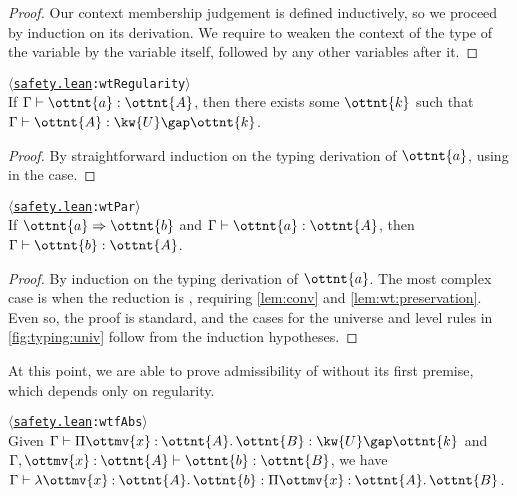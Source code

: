\documentclass[a4paper,UKenglish,cleveref,autoref,thm-restate]{lipics-v2021}
\newcommand{\repo}{https://github.com/ionathanch/TTBFL}
\newcommand{\thmref}[2]{%
  $\langle$\href{\repo/tree/main/src/#1}{\texttt{#1}}\texttt{:#2}$\rangle$%
}
\begin{document}
\begin{proof}
  Our context membership judgement is defined inductively,
  so we proceed by induction on its derivation.
  We require  to weaken the context of the type of the variable
  by the variable itself, followed by any other variables after it.
\end{proof}

\begin{lemma}[Regularity] \thmref{safety.lean}{wtRegularity} \label{lem:wt:reg} \\
  If $ \Gamma  \vdash  \ottnt{a}  \mathrel{:}  \ottnt{A} $, then there exists some $\ottnt{k}$ such that
  $ \Gamma  \vdash  \ottnt{A}  \mathrel{:}   \kw{U} \gap  \ottnt{k}  $.
\end{lemma}

\begin{proof}
  By straightforward induction on the typing derivation of $\ottnt{a}$,
  using  in the  case.
\end{proof}
\fi

\begin{theorem} \thmref{safety.lean}{wtPar} \label{lem:preservation} \\
  If $ \ottnt{a}  \Rightarrow  \ottnt{b} $ and $ \Gamma  \vdash  \ottnt{a}  \mathrel{:}  \ottnt{A} $, then $ \Gamma  \vdash  \ottnt{b}  \mathrel{:}  \ottnt{A} $.
\end{theorem}

\begin{proof}
  By induction on the typing derivation of $\ottnt{a}$.
  The most complex case is when the reduction is ,
  requiring \cref{lem:conv} and \cref{lem:wt:preservation}.
  Even so, the proof is standard,
  and the cases for the universe and level rules in \cref{fig:typing:univ}
  follow from the induction hypotheses.
\end{proof}

At this point, we are able to prove admissibility of 
without its first premise, which depends only on regularity.

\begin{corollary} \thmref{safety.lean}{wtfAbs} \label{Lam'} \\
  Given $ \Gamma  \vdash   \Pi  \ottmv{x}  \mathbin{:}  \ottnt{A}  \mathpunct{.}  \ottnt{B}   \mathrel{:}   \kw{U} \gap  \ottnt{k}  $ and $  \Gamma ,  \ottmv{x}  \mathbin{:}  \ottnt{A}   \vdash  \ottnt{b}  \mathrel{:}  \ottnt{B} $,
  we have $ \Gamma  \vdash   \lambda  \ottmv{x}  \mathbin{:}  \ottnt{A}  \mathpunct{.}  \ottnt{b}   \mathrel{:}   \Pi  \ottmv{x}  \mathbin{:}  \ottnt{A}  \mathpunct{.}  \ottnt{B}  $.
\end{corollary}
\end{document}
